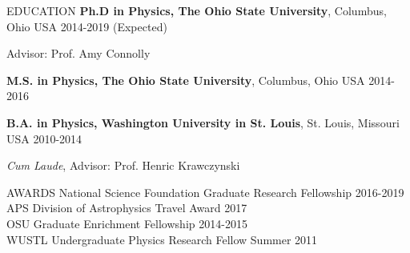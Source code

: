 \documentclass{resume} %
\newenvironment{list1}{
  \begin{list}{\ding{113}}{%
      \setlength{\itemsep}{0in}
      \setlength{\parsep}{0in} \setlength{\parskip}{0in}
      \setlength{\topsep}{0in} \setlength{\partopsep}{0in} 
      \setlength{\leftmargin}{0.17in}}}{\end{list}}
\begin{document}

\begin{rSection}{EDUCATION}
\textbf{Ph.D in Physics, The Ohio State University}, Columbus, Ohio USA \hfill 2014-2019 (Expected)\\
\vspace*{-.15in}
\begin{list1}
\item[]Advisor: Prof. Amy Connolly
\end{list1}

\textbf{M.S. in Physics, The Ohio State University}, Columbus, Ohio USA \hfill 2014-2016

\textbf{B.A. in Physics, Washington University in St. Louis}, St. Louis, Missouri USA \hfill 2010-2014\\
\vspace*{-.15in}
\begin{list1}
\item[] \textit{Cum Laude}, Advisor: Prof. Henric Krawczynski
\end{list1}
\end{rSection}


\begin{rSection}{AWARDS}
National Science Foundation Graduate Research Fellowship \hfill 2016-2019 \\
APS Division of Astrophysics Travel Award \hfill 2017 \\
OSU Graduate Enrichment Fellowship \hfill 2014-2015 \\
WUSTL Undergraduate Physics Research Fellow \hfill Summer 2011 
\end{rSection}

\end{document}
